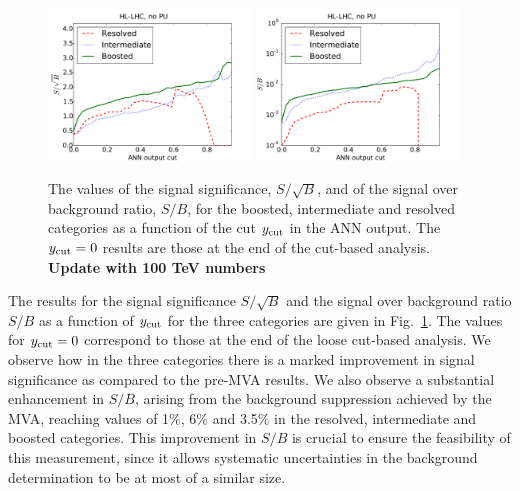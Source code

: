 \documentclass[a4paper,11pt]{article}
\begin{document}
\begin{figure}[t]
\begin{center}
\includegraphics[width=0.48\textwidth]{plots/ssb_noPU.pdf}
\includegraphics[width=0.48\textwidth]{plots/sb_noPU.pdf}
\caption{\small
  The values of the signal significance, $S/\sqrt{B}$, and of the
  signal over background ratio, $S/B$, for the boosted, intermediate
  and resolved categories as a function of the cut
  $y_{\rm cut}$ in the ANN output.
  The $y_{\rm cut}=0$
  results are those at the end of the cut-based
  analysis. {\bf Update with 100 TeV numbers}
}
\label{fig:sb_mva}
\end{center}
\end{figure}

The results for the signal significance $S/\sqrt{B}$ and
the signal over background ratio
$S/B$ as a function of $y_{\rm cut}$
for the three categories are given in 
Fig.~\ref{fig:sb_mva}.
%
The values 
for $y_{\rm cut}=0$ correspond to those at
the end of the loose cut-based analysis.
%
We observe how in the three
 categories there is a marked  improvement in signal
significance as compared to the pre-MVA results.
%
We also observe a substantial enhancement in $S/B$, arising
from the background suppression achieved by the MVA, reaching
values of 1\%, 6\% and 3.5\% in the resolved,
intermediate and boosted categories.
%
This improvement in $S/B$ is crucial to ensure the feasibility
of this measurement, since it allows systematic
uncertainties in the background determination to
be at most of a similar size.
\end{document}
